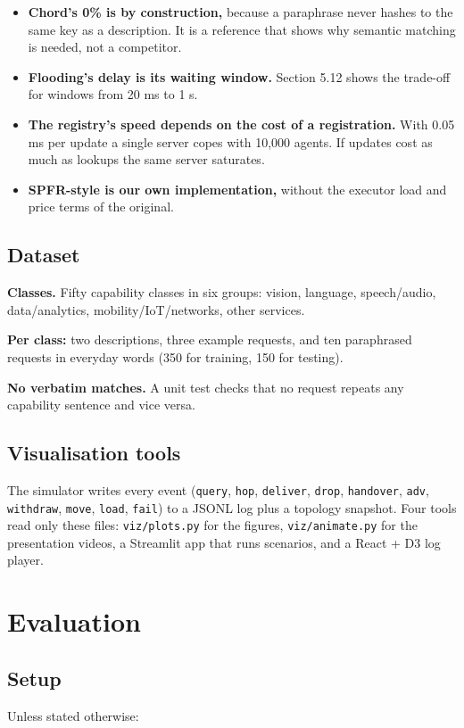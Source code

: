 \documentclass[journal]{IEEEtran}
\begin{document}
\begin{itemize}
\item \textbf{Chord's 0\% is by construction,} because a paraphrase never hashes to the same key as a description. It is a reference that shows why semantic matching is needed, not a competitor.
\item \textbf{Flooding's delay is its waiting window.} Section 5.12 shows the trade-off for windows from 20 ms to 1 s.
\item \textbf{The registry's speed depends on the cost of a registration.} With 0.05 ms per update a single server copes with 10,000 agents. If updates cost as much as lookups the same server saturates.
\item \textbf{SPFR-style is our own implementation,} without the executor load and price terms of the original.
\end{itemize}

\subsection{Dataset}
\textbf{Classes.} Fifty capability classes in six groups: vision, language, speech/audio, data/analytics, mobility/IoT/networks, other services.

\textbf{Per class:} two descriptions, three example requests, and ten paraphrased requests in everyday words (350 for training, 150 for testing).

\textbf{No verbatim matches.} A unit test checks that no request repeats any capability sentence and vice versa.

\subsection{Visualisation tools}
The simulator writes every event (\texttt{query}, \texttt{hop}, \texttt{deliver}, \texttt{drop}, \texttt{handover}, \texttt{adv}, \texttt{withdraw}, \texttt{move}, \texttt{load}, \texttt{fail}) to a JSONL log plus a topology snapshot. Four tools read only these files: \texttt{viz/\allowbreak plots.py} for the figures, \texttt{viz/\allowbreak animate.py} for the presentation videos, a Streamlit app that runs scenarios, and a React + D3 log player.

\section{Evaluation}
\subsection{Setup}
Unless stated otherwise:
\end{document}
